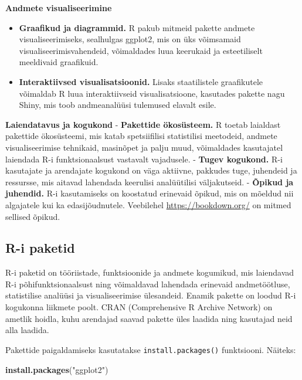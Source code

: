 \documentclass[
]{book}
\newenvironment{Shaded}{\begin{snugshade}}{\end{snugshade}}
\newcommand{\FunctionTok}[1]{\textcolor[rgb]{0.13,0.29,0.53}{\textbf{#1}}}
\newcommand{\NormalTok}[1]{#1}
\newcommand{\StringTok}[1]{\textcolor[rgb]{0.31,0.60,0.02}{#1}}
\providecommand{\tightlist}{%
  \setlength{\itemsep}{0pt}\setlength{\parskip}{0pt}}
\renewenvironment{Shaded} {\begin{snugshade}\footnotesize} {\end{snugshade}}
\begin{document}
\textbf{Andmete visualiseerimine}

\begin{itemize}
\tightlist
\item
  \textbf{Graafikud ja diagrammid.} R pakub mitmeid pakette andmete visualiseerimiseks, sealhulgas ggplot2, mis on üks võimsamaid visualiseerimisvahendeid, võimaldades luua keerukaid ja esteetiliselt meeldivaid graafikuid.
\item
  \textbf{Interaktiivsed visualisatsioonid.} Lisaks staatilistele graafikutele võimaldab R luua interaktiivseid visualisatsioone, kasutades pakette nagu Shiny, mis toob andmeanalüüsi tulemused elavalt esile.
\end{itemize}

\textbf{Laiendatavus ja kogukond}
- \textbf{Pakettide ökosüsteem.} R toetab laialdast pakettide ökosüsteemi, mis katab spetsiifilisi statistilisi meetodeid, andmete visualiseerimise tehnikaid, masinõpet ja palju muud, võimaldades kasutajatel laiendada R-i funktsionaalsust vastavalt vajadusele.
- \textbf{Tugev kogukond.} R-i kasutajate ja arendajate kogukond on väga aktiivne, pakkudes tuge, juhendeid ja ressursse, mis aitavad lahendada keerulisi analüütilisi väljakutseid.
- \textbf{Õpikud ja juhendid.} R-i kasutamiseks on koostatud erinevaid õpikud, mis on mõeldud nii algajatele kui ka edasijõudnutele. Veebilehel \url{https://bookdown.org/} on mitmed sellised õpikud.

\subsection{R-i paketid}\label{r-i-paketid}

R-i paketid on tööriistade, funktsioonide ja andmete kogumikud, mis laiendavad R-i põhifunktsionaalsust ning võimaldavad lahendada erinevaid andmetöötluse, statistilise analüüsi ja visualiseerimise ülesandeid. Enamik pakette on loodud R-i kogukonna liikmete poolt. CRAN (Comprehensive R Archive Network) on ametlik hoidla, kuhu arendajad saavad pakette üles laadida ning kasutajad neid alla laadida.

Pakettide paigaldamiseks kasutatakse \texttt{install.packages()} funktsiooni. Näiteks:

\begin{Shaded}
\begin{Highlighting}[]
\FunctionTok{install.packages}\NormalTok{(}\StringTok{"ggplot2"}\NormalTok{)}
\end{Highlighting}
\end{Shaded}
\end{document}
